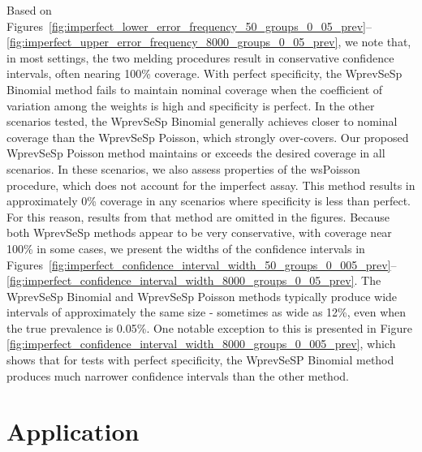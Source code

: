 Based on Figures~\ref{fig:imperfect_lower_error_frequency_50_groups_0_05_prev}--\ref{fig:imperfect_upper_error_frequency_8000_groups_0_05_prev}, we note that, in most settings, the two melding procedures result in conservative confidence intervals, often nearing 100\% coverage.
With perfect specificity, the WprevSeSp Binomial method fails to maintain nominal coverage when the coefficient of variation among the weights is high and specificity is perfect.
In the other scenarios tested, the WprevSeSp Binomial generally achieves closer to nominal coverage than the WprevSeSp Poisson, which strongly over-covers.
Our proposed WprevSeSp Poisson method maintains or exceeds the desired coverage in all scenarios.
In these scenarios, we also assess properties of the wsPoisson procedure, which does not account for the imperfect assay.
This method results in approximately 0\% coverage in any scenarios where specificity is less than perfect.
For this reason, results from that method are omitted in the figures.
Because both WprevSeSp methods appear to be very conservative, with coverage near 100\% in some cases, we present the widths of the confidence intervals in Figures~\ref{fig:imperfect_confidence_interval_width_50_groups_0_005_prev}--\ref{fig:imperfect_confidence_interval_width_8000_groups_0_05_prev}.
The WprevSeSp Binomial and WprevSeSp Poisson methods typically produce wide intervals of approximately the same size - sometimes as wide as 12\%, even when the true prevalence is 0.05\%.
One notable exception to this is presented in Figure \ref{fig:imperfect_confidence_interval_width_8000_groups_0_005_prev}, which shows that for tests with perfect specificity, the WprevSeSP Binomial method produces much narrower confidence intervals than the other method.

\section{Application}
\label{sec-Application}

